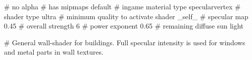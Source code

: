 # no alpha
# has mipmaps
default			 # ingame material type
specularvertex	         # shader type
ultra			 # minimum quality to activate shader
_self_			 # specular map
0.45		 	 # overall strength
6			 # power exponent
0.65			 # remaining diffuse sun light

# General wall-shader for buildings. Full specular intensity is used for windows and metal parts in wall textures.



